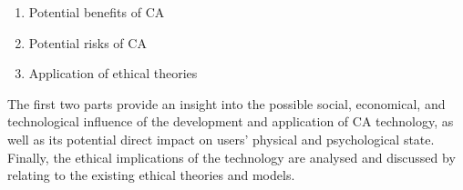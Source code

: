 \begin{enumerate}
	\item Potential benefits of CA
	\item Potential risks of CA
	\item Application of ethical theories 
\end{enumerate}

The first two parts provide an insight into the possible social, economical, and technological influence of the development and application of CA technology, as well as its potential direct impact on users' physical and psychological state. Finally, the ethical implications of the technology are analysed and discussed by relating to the existing ethical theories and models.




